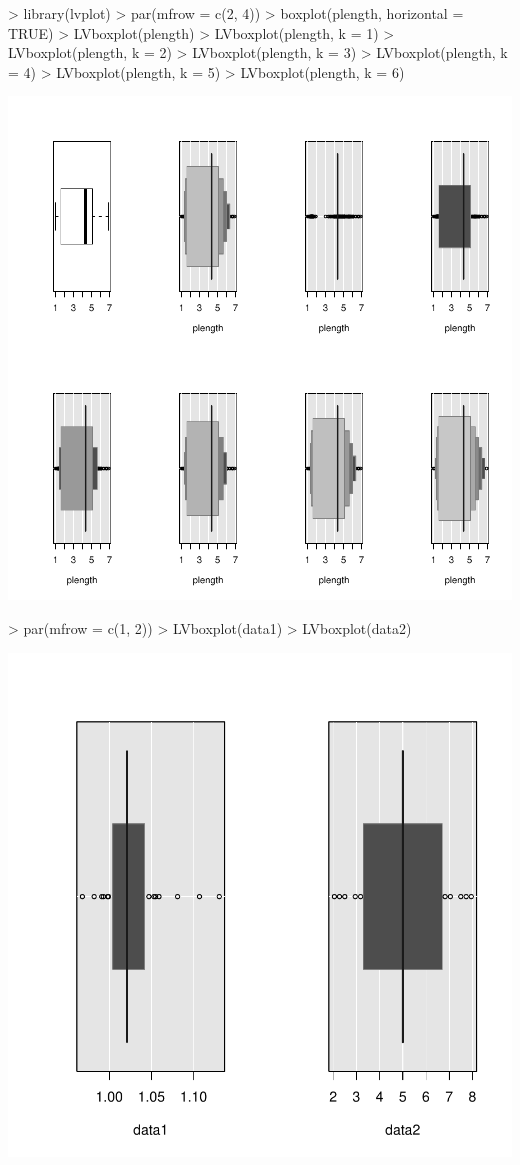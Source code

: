 \documentclass[12pt,letterpaper,final]{article}
\begin{document}
\begin{Schunk}
\begin{Sinput}
> library(lvplot)
> par(mfrow = c(2, 4))
> boxplot(plength, horizontal = TRUE)
> LVboxplot(plength)
> LVboxplot(plength, k = 1)
> LVboxplot(plength, k = 2)
> LVboxplot(plength, k = 3)
> LVboxplot(plength, k = 4)
> LVboxplot(plength, k = 5)
> LVboxplot(plength, k = 6)
\end{Sinput}
\end{Schunk}
\includegraphics{lect_main-014}


\begin{Schunk}
\begin{Sinput}
> par(mfrow = c(1, 2))
> LVboxplot(data1)
> LVboxplot(data2)
\end{Sinput}
\end{Schunk}
\includegraphics{lect_main-015}
\end{document}

